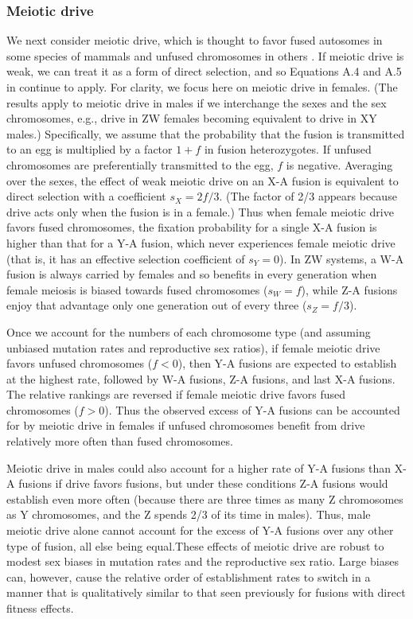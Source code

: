 \subsubsection{Meiotic drive}
We next consider meiotic drive, which is thought to favor fused autosomes in some species of mammals and unfused chromosomes in others \citep{Pardo2001a, Pardo2001b}. If meiotic drive is weak, we can treat it as a form of direct selection, and so Equations A.4 and A.5 in  continue to apply. For clarity, we focus here on meiotic drive in females. (The results apply to meiotic drive in males if we interchange the sexes and the sex chromosomes, e.g., drive in ZW females becoming equivalent to drive in XY males.) Specifically, we assume that the probability that the fusion is transmitted to an egg is multiplied by a factor $1+f$ in fusion heterozygotes. If unfused chromosomes are preferentially transmitted to the egg, $f$ is negative. Averaging over the sexes, the effect of weak meiotic drive on an X-A fusion is equivalent to direct selection with a coefficient $s_X = \text{2}f/\text{3}$. (The factor of 2/3 appears because drive acts only when the fusion is in a female.) Thus when female meiotic drive favors fused chromosomes, the fixation probability for a single X-A fusion is higher than that for a Y-A fusion, which never experiences female meiotic drive (that is, it has an effective selection coefficient of $s_Y=\text{0}$). In ZW systems, a W-A fusion is always carried by females and so benefits in every generation when female meiosis is biased towards fused chromosomes ($s_W=f$), while Z-A fusions enjoy that advantage only one generation out of every three ($s_Z = f/\text{3}$).
 
Once we account for the numbers of each chromosome type (and assuming unbiased mutation rates and reproductive sex ratios), if female meiotic drive favors unfused chromosomes ($f < \text{0}$), then Y-A fusions are expected to establish at the highest rate, followed by W-A fusions, Z-A fusions, and last X-A fusions. The relative rankings are reversed if female meiotic drive favors fused chromosomes ($f > \text{0}$). Thus the observed excess of Y-A fusions can be accounted for by meiotic drive in females if unfused chromosomes benefit from drive relatively more often than fused chromosomes.

Meiotic drive in males could also account for a higher rate of Y-A fusions than X-A fusions if drive favors fusions, but under these conditions Z-A fusions would establish even more often (because there are three times as many Z chromosomes as Y chromosomes, and the Z spends 2/3 of its time in males). Thus, male meiotic drive alone cannot account for the excess of Y-A fusions over any other type of fusion, all else being equal.These effects of meiotic drive are robust to modest sex biases in mutation rates and the reproductive sex ratio. Large biases can, however, cause the relative order of establishment rates to switch in a manner that is qualitatively similar to that seen previously for fusions with direct fitness effects.

